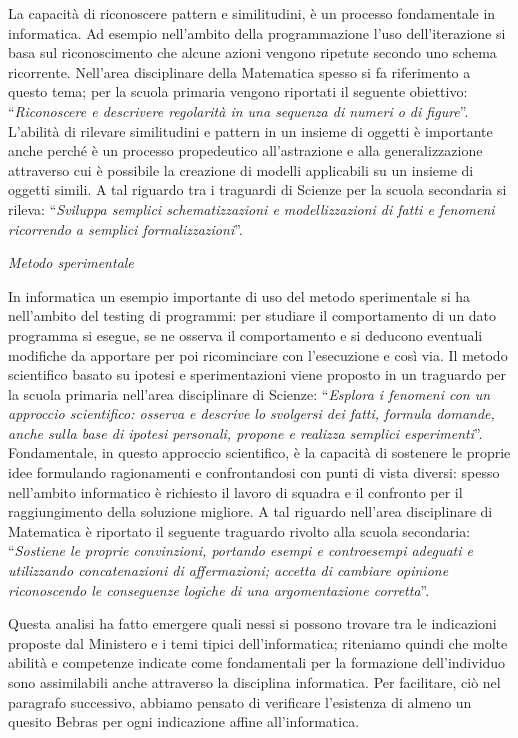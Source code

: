 \documentclass[12pt]{report}
\begin{document}
\noindent La capacità di riconoscere pattern e similitudini, è un processo fondamentale in informatica. Ad esempio nell'ambito della programmazione l'uso dell'iterazione si basa sul riconoscimento che alcune azioni vengono ripetute secondo uno schema ricorrente.
Nell'area disciplinare della Matematica spesso si fa riferimento a questo tema; per la scuola primaria vengono riportati il seguente obiettivo: ``\textit{Riconoscere e descrivere regolarità in una sequenza di numeri o di figure}''.
L'abilità di rilevare similitudini e pattern in un insieme di oggetti è importante anche perché è un processo propedeutico all'astrazione e alla generalizzazione attraverso cui è possibile la creazione di modelli applicabili su un insieme di oggetti simili. A tal riguardo tra i traguardi di Scienze per la scuola secondaria si rileva: ``\textit{Sviluppa semplici schematizzazioni e modellizzazioni di fatti e fenomeni ricorrendo a semplici formalizzazioni}''.

\bigskip
\textit{Metodo sperimentale}

\noindent In informatica un esempio importante di uso del metodo sperimentale si ha nell'ambito del testing di programmi: per studiare il comportamento di un dato programma si esegue, se ne osserva il comportamento e si deducono eventuali modifiche da apportare per poi ricominciare con l'esecuzione e così via.
Il metodo scientifico basato su ipotesi e sperimentazioni viene proposto in un traguardo per la scuola primaria nell'area disciplinare di Scienze: ``\textit{Esplora i fenomeni con un approccio scientifico: osserva e descrive lo svolgersi dei fatti, formula domande, anche sulla base di ipotesi personali, propone e realizza semplici esperimenti}''.
Fondamentale, in questo approccio scientifico, è la capacità di sostenere le proprie idee formulando ragionamenti e confrontandosi con punti di vista diversi: spesso nell'ambito informatico è richiesto il lavoro di squadra e il confronto per il raggiungimento della soluzione migliore. A tal riguardo nell'area disciplinare di Matematica è riportato il seguente traguardo rivolto alla scuola secondaria: ``\textit{Sostiene le proprie convinzioni, portando esempi e controesempi adeguati e utilizzando concatenazioni di affermazioni; accetta di cambiare opinione riconoscendo le conseguenze logiche di una argomentazione corretta}''.



\bigskip
Questa analisi ha fatto emergere quali nessi si possono trovare tra le indicazioni proposte dal Ministero e i temi tipici dell'informatica; riteniamo quindi che molte abilità e competenze indicate come fondamentali per la formazione dell'individuo sono assimilabili anche attraverso la disciplina informatica. Per facilitare, ciò nel paragrafo successivo, abbiamo pensato di verificare l'esistenza di almeno un quesito Bebras per ogni indicazione affine all'informatica.
\end{document}
